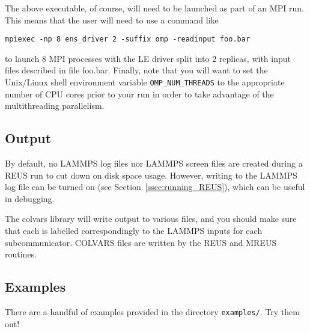 \documentclass[10pt]{article}
\begin{document}
The above executable, of course, will need to be launched as part of an MPI run. This means
that the user will need to use a command like
\begin{verbatim}
mpiexec -np 8 ens_driver 2 -suffix omp -readinput foo.bar
\end{verbatim}
to launch 8 MPI processes with the LE driver split into 2 replicas, 
with input files described in file foo.bar.
Finally, note that you will want to
set the Unix/Linux shell environment variable \texttt{OMP\_NUM\_THREADS} to the appropriate
number of CPU cores prior to your run in order to take advantage of the multithreading parallelism. 



\subsection{Output}

By default, no LAMMPS log files nor LAMMPS screen files are created during a REUS 
run to cut down on disk space usage. However, writing to the LAMMPS log file can 
be turned on (see Section~\ref{ssec:running_REUS}), which can be useful in debugging.

The colvars library will write output to various files, and you should make sure
that each is labelled correspondingly to the LAMMPS inputs for each subcommunicator.
COLVARS files are written by the REUS and MREUS routines.

\subsection{Examples}

There are a handful of examples provided in the directory \texttt{examples/}. Try them out!
\end{document}
